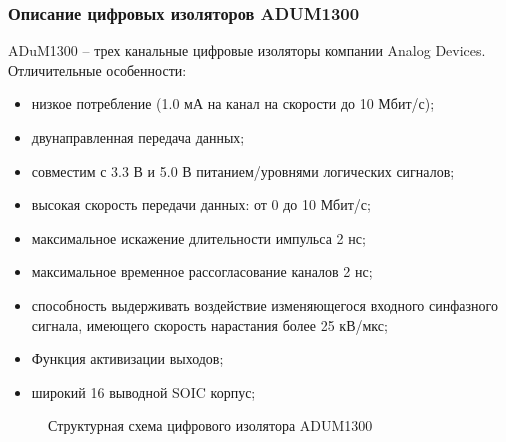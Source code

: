     \subsubsection{Описание цифровых изоляторов ADUM1300}
        ADuM1300 – трех канальные цифровые изоляторы компании Analog Devices.
        Отличительные особенности:
        \begin{itemize}
            \item низкое потребление (1.0 мА на канал на скорости до 10
                Мбит/с);
            \item двунаправленная передача данных;
            \item совместим с 3.3 В и 5.0 В питанием/уровнями логических
                сигналов;
            \item высокая скорость передачи данных: от 0 до 10 Мбит/с;
            \item максимальное искажение длительности импульса 2 нс;
            \item максимальное временное рассогласование каналов 2 нс;
            \item способность выдерживать воздействие изменяющегося входного
                синфазного сигнала, имеющего скорость нарастания более 25
                кВ/мкс;
            \item Функция активизации выходов;
            \item широкий 16 выводной SOIC корпус;
        \end{itemize}

        \begin{figure}[h!]
            \caption{Структурная схема цифрового изолятора ADUM1300}
            \label{fig:adum1300}
        \end{figure}

